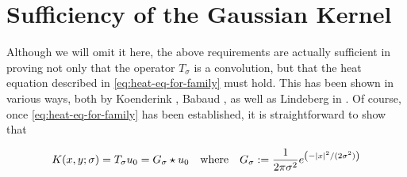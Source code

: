     \section{Sufficiency of the Gaussian Kernel}
    
    Although we will omit it here, the above requirements are actually sufficient in proving not only that the operator $T_\sigma$ is a convolution, but that the heat equation described in \cref{eq:heat-eq-for-family} must hold. This has been shown in various ways, both by Koenderink \autocite{Koenderink}, Babaud \autocite{babaud}, as well as Lindeberg in \autocite{GSST-book}. Of course, once \cref{eq:heat-eq-for-family} has been established, it is straightforward to show that
    
    \begin{equation}
       K(x,y;\sigma) = T_{\sigma} u_0 = G_\sigma \star u_0
       	\quad \textrm{where}\quad
       	G_\sigma := \frac{1}{2\pi \sigma^2} e^{\left(-\vert x\vert^2 / (2\sigma^2)\right)}
        \end{equation}
    
